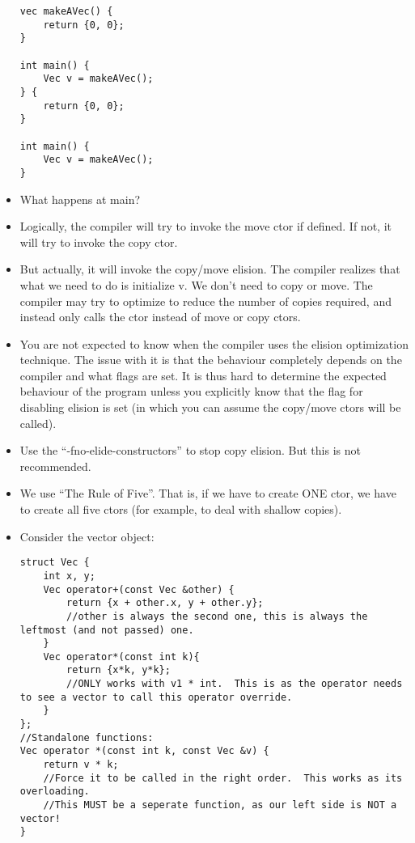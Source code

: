 \documentclass{article}
\begin{document}
\begin{itemize}
\begin{lstlisting}
vec makeAVec() {
    return {0, 0};
}

int main() {
    Vec v = makeAVec();
} {
    return {0, 0};
}

int main() {
    Vec v = makeAVec();
}
\end{lstlisting}
\item What happens at main?
\item Logically, the compiler will try to invoke the move ctor if defined.  If not, it will try to invoke the copy ctor.
\item But actually, it will invoke the copy/move elision.  The compiler realizes that what we need to do is initialize v.  We don't need to copy or move.  The compiler may try to optimize to reduce the number of copies required, and instead only calls the ctor instead of move or copy ctors.
\item You are not expected to know when the compiler uses the elision optimization technique.  The issue with it is that the behaviour completely depends on the compiler and what flags are set.  It is thus hard to determine the expected behaviour of the program unless you explicitly know that the flag for disabling elision is set (in which you can assume the copy/move ctors will be called).
\item Use the ``-fno-elide-constructors'' to stop copy elision.  But this is not recommended.
\item We use ``The Rule of Five''.  That is, if we have to create ONE ctor, we have to create all five ctors (for example, to deal with shallow copies).
\item Consider the vector object:
\begin{lstlisting}
struct Vec {
    int x, y;
    Vec operator+(const Vec &other) {
        return {x + other.x, y + other.y}; 
        //other is always the second one, this is always the leftmost (and not passed) one.
    }
    Vec operator*(const int k){
        return {x*k, y*k};
        //ONLY works with v1 * int.  This is as the operator needs to see a vector to call this operator override.
    } 
};
//Standalone functions:
Vec operator *(const int k, const Vec &v) {
    return v * k;
    //Force it to be called in the right order.  This works as its overloading.
    //This MUST be a seperate function, as our left side is NOT a vector!
}


\end{lstlisting}
\end{itemize}
\end{document}
